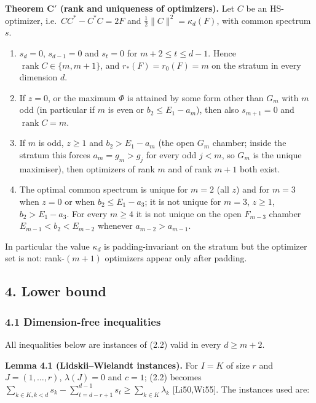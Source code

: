 \documentclass[
  11pt,
  a4paper,
]{article}
\providecommand{\tightlist}{%
  \setlength{\itemsep}{0pt}\setlength{\parskip}{0pt}}
\begin{document}
\textbf{Theorem C\('\) (rank and uniqueness of optimizers).} Let \(C\)
be an HS-optimizer, i.e.~\(CC^*-C^*C=2F\) and
\(\tfrac12\|C\|^2=\kappa_d(F)\), with common spectrum \(s\).

\begin{enumerate}
\def\labelenumi{\arabic{enumi}.}
\tightlist
\item
  \(s_d=0\), \(s_{d-1}=0\) and \(s_t=0\) for \(m+2\le t\le d-1\). Hence
  \(\operatorname{rank}C\in\{m,\allowbreak{}m+1\}\), and \(r_*(F)=r_0(F)=m\) on the
  stratum in every dimension \(d\).
\item
  If \(z=0\), or the maximum \(\Phi\) is attained by some form other
  than \(G_m\) with \(m\) odd (in particular if \(m\) is even or
  \(b_2\le E_1-a_m\)), then also \(s_{m+1}=0\) and
  \(\operatorname{rank}C=m\).
\item
  If \(m\) is odd, \(z\ge1\) and \(b_2>E_1-a_m\) (the open \(G_m\)
  chamber; inside the stratum this forces \(a_m=g_m>g_j\) for every odd
  \(j<m\), so \(G_m\) is the unique maximiser), then optimizers of rank
  \(m\) and of rank \(m+1\) both exist.
\item
  The optimal common spectrum is unique for \(m=2\) (all \(z\)) and for
  \(m=3\) when \(z=0\) or when \(b_2\le E_1-a_3\); it is not unique for
  \(m=3\), \(z\ge1\), \(b_2>E_1-a_3\). For every \(m\ge4\) it is not
  unique on the open \(F_{m-3}\) chamber \(E_{m-1}<b_2<E_{m-2}\)
  whenever \(a_{m-2}>a_{m-1}\).
\end{enumerate}

In particular the value \(\kappa_d\) is padding-invariant on the stratum
but the optimizer set is not: rank-\((m+1)\) optimizers appear only
after padding.

\subsection{4. Lower bound}\label{lower-bound}

\subsubsection{4.1 Dimension-free
inequalities}\label{dimension-free-inequalities}

All inequalities below are instances of (2.2) valid in every
\(d\ge m+2\).

\textbf{Lemma 4.1 (Lidskii--Wielandt instances).} For \(I=K\) of size
\(r\) and \(J=(1,\allowbreak{}\dots,\allowbreak{}r)\), \(\lambda(J)=0\) and \(c=1\); (2.2) becomes
\(\sum_{k\in K,\allowbreak{}k<d}s_k-\sum_{t=d-r+1}^{d-1}s_t\ge\sum_{k\in K}\lambda_k\)
{[}Li50,Wi55{]}. The instances used are:
\end{document}
